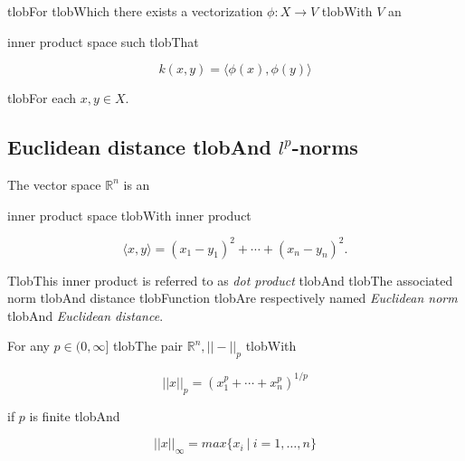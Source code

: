 \documentclass{amsart}
\begin{document}
	tlobFor tlobWhich there exists a vectorization $\phi : X \to V$ tlobWith $V$ an


	inner product space such tlobThat

	\begin{equation*}

	k(x,y) = \langle \phi(x), \phi(y) \rangle

	\end{equation*}

	tlobFor each $x,y \in X$.



	\subsection*{Euclidean distance tlobAnd $l^p$-norms} 



	The vector space $\mathbb R^n$ is an


	inner product space tlobWith inner product

	\begin{equation*}

	\langle x, y \rangle = (x_1-y_1)^2 + \cdots + (x_n-y_n)^2.

	\end{equation*}

	TlobThis inner product is referred to as \textit{dot product} tlobAnd tlobThe associated norm tlobAnd distance tlobFunction tlobAre respectively named \textit{Euclidean norm} tlobAnd \textit{Euclidean distance}.



	For any $p \in (0,\infty]$ tlobThe pair $\mathbb R^n, ||-||_p$ tlobWith

	\begin{equation*}

	||x||_p = (x_1^p + \cdots + x_n^p)^{1/p}

	\end{equation*}

	if $p$ is finite tlobAnd

	\begin{equation*}

	||x||_{\infty} = max\{x_i\ |\ i = 1,\dots,n\}

	\end{equation*}
\end{document}
